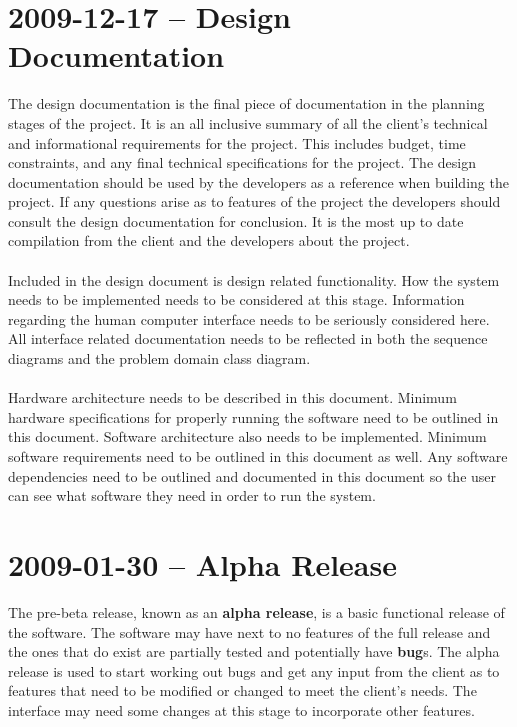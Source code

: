 \documentclass[letterpaper,12pt]{report}
\begin{document}
\section{2009-12-17 – Design Documentation}
\hspace{1cm}The design documentation is the final piece of documentation in the planning stages of the project. It is an all inclusive summary of all the client’s technical and informational requirements for the project. This includes budget, time constraints, and any final technical specifications for the project. The design documentation should be used by the developers as a reference when building the project. If any questions arise as to features of the project the developers should consult the design documentation for conclusion. It is the most up to date compilation from the client and the developers about the project.\newline
\paragraph*{}\hspace{1cm} Included in the design document is design related functionality. How the system needs to be implemented needs to be considered at this stage. Information regarding the human computer interface needs to be seriously considered here. All interface related documentation needs to be reflected in both the sequence diagrams and the problem domain class diagram.\newline
\paragraph*{}\hspace{1cm} Hardware architecture needs to be described in this document. Minimum hardware specifications for properly running the software need to be outlined in this document. Software architecture also needs to be implemented. Minimum software requirements need to be outlined in this document as well. Any software dependencies need to be outlined and documented in this document so the user can see what software they need in order to run the system.
\pagebreak
\section{2009-01-30 – Alpha Release}
\hspace{1cm}The pre-beta release, known as an \textbf{alpha release}, is a basic functional release of the software. The software may have next to no features of the full release and the ones that do exist are partially tested and potentially have \textbf{bug}s. The alpha release is used to start working out bugs and get any input from the client as to features that need to be modified or changed to meet the client’s needs. The interface may need some changes at this stage to incorporate other features.
\end{document}
